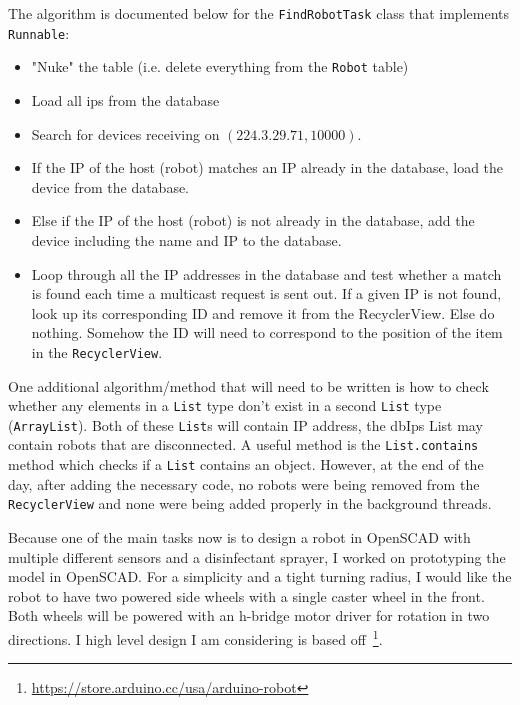 \documentclass[fontsize=11pt, %
                             paper=a4, %
                             twoside, %
                             captions=tableheading,
                             index=totoc,
                             hyperref]{labbook}
\begin{document}
\begin{addmargin}[0cm]{0cm}
The algorithm is documented below for the \texttt{FindRobotTask} class that implements \texttt{Runnable}:
\begin{itemize}
\item "Nuke" the table (i.e. delete everything from the \texttt{Robot} table)
\item Load all ips from the database
\item Search for devices receiving on $(224.3.29.71, 10000)$.
\item If the IP of the host (robot) matches an IP already in the database, load the device from the database.
\item Else if the IP of the host (robot) is not already in the database, add the device including the name and IP to the database.
\item Loop through all the IP addresses in the database and test whether a match is found each time a multicast request is sent out. If a given IP is not found, look up its corresponding ID and remove it from the RecyclerView. Else do nothing. Somehow the ID will need to correspond to the position of the item in the \texttt{RecyclerView}.   
\end{itemize}
One additional algorithm/method that will need to be written is how to check whether any elements in a \texttt{List} type don't exist in a second \texttt{List} type (\texttt{ArrayList}). Both of these \texttt{List}s will contain IP address, the dbIps List may contain robots that are disconnected. A useful method is the \texttt{List.contains} method which checks if a \texttt{List} contains an object. However, at the end of the day, after adding the necessary code, no robots were being removed from the \texttt{RecyclerView} and none were being added properly in the background threads.

Because one of the main tasks now is to design a robot in OpenSCAD with multiple different sensors and a disinfectant sprayer, I worked on prototyping the model in OpenSCAD. For a simplicity and a tight turning radius, I would like the robot to have two powered side wheels with a single caster wheel in the front. Both wheels will be powered with an h-bridge motor driver for rotation in two directions. I high level design I am considering is based off~\footnote{\url{https://store.arduino.cc/usa/arduino-robot}}. 


\end{addmargin}
\end{document}

